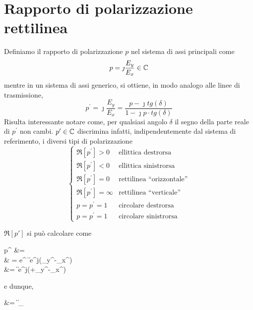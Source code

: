 \section{Rapporto di polarizzazione rettilinea}
Definiamo il rapporto di polarizzazione $p$ nel sistema di assi principali come
\begin{equation}
	p = \jmath \frac{E_y}{E_x} \in \mathbb{C}
\end{equation}
mentre in un sistema di assi generico, si ottiene, in modo analogo alle linee di trasmissione,
\begin{equation}
	p^\prime = \jmath \frac{E_y}{E_x} = \frac{p - \jmath tg(\delta)}{1-\jmath p \cdot tg(\delta)}
\end{equation}
Risulta interessante notare come, per qualsiasi angolo $\delta$ il segno della parte reale di $p^\prime$ non cambi. $p^\prime \in \mathbb{C}$ discrimina infatti, indipendentemente dal sistema di referimento, i diversi tipi di polarizzazione
\begin{equation}\begin{cases}
	\Re[p^\prime] >0 & \text{ellittica destrorsa} \\
	\Re[p^\prime] <0 & \text{ellittica sinistrorsa} \\
	\Re[p^\prime] =0 & \text{rettilinea ``orizzontale''} \\
	\Re[p^\prime] =\infty & \text{rettilinea ``verticale''} \\
	p = p^\prime = 1 & \text{circolare destrorsa} \\
	p = p^\prime = 1 & \text{circolare sinistrorsa}
\end{cases}\end{equation}


$\Re [p\prime]$ si può calcolare come
\begin{esp*}
	p^\prime
	&= \jmath {} \\
	& = e^{\jmath {}} \cdot \left \|  \right \|
	\cdot e^{j(\Phi_{y^{\prime}}-\Phi_{x^{\prime}})} \\
	&= \left \|  \right \| \cdot e^{j(+\Phi_{y^{\prime}}-\Phi_{x^{\prime}})}
\end{esp*}

e dunque,
\begin{esp*}
	\Re[p^\prime]
	&= \left \|  \right \| \cdot {}_{}
\end{esp*}

